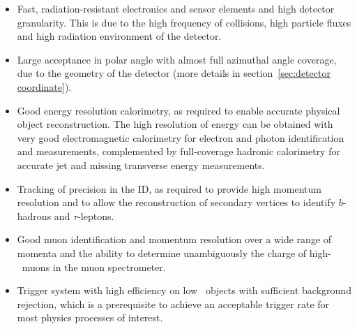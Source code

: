 \begin{itemize}
\item
Fast, radiation-resistant electronics and sensor elements 
and high detector granularity. This is due to the
 high frequency of collisions, high particle fluxes and 
 high radiation environment of the detector.
\item
Large acceptance in polar angle with almost full azimuthal angle coverage,
due to the geometry of the detector 
(more details in section~\ref{sec:detector coordinate}).
\item
Good energy resolution calorimetry, as required to 
enable accurate physical object reconstruction. 
The high resolution of energy can be obtained 
with very good electromagnetic calorimetry for 
electron and photon identification and measurements,
complemented by full-coverage hadronic calorimetry 
for accurate jet and missing transverse energy measurements.
\item  
Tracking of precision in the ID, as required to provide high momentum 
resolution and to allow the reconstruction of
secondary vertices to identify $b$-hadrons and $\tau$-leptons.
\item
Good muon identification and momentum resolution 
over a wide range of momenta and the ability 
to determine unambiguously the charge of high-\pt\ 
muons in the muon spectrometer.
\item
Trigger system with high efficiency on low \pt\  
objects with sufficient background rejection, 
which is a prerequisite to achieve an acceptable trigger rate 
for most physics processes of interest.
\end{itemize}


